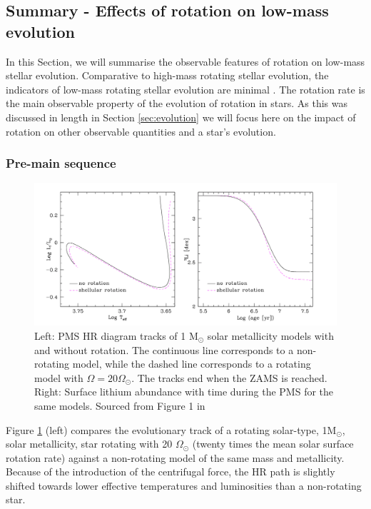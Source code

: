 \subsection{Summary - Effects of rotation on low-mass evolution}

In this Section, we will summarise the observable features of rotation on low-mass stellar evolution.
Comparative to high-mass rotating stellar evolution, the indicators of low-mass rotating stellar evolution are minimal \citep[See ][]{heger_presupernova_2000, maeder_evolution_2000}.
The rotation rate is the main observable property of the evolution of rotation in stars.
As this was discussed in length in Section \ref{sec:evolution} we will focus here on the impact of rotation on other observable quantities and a star's evolution.

\subsubsection{Pre-main sequence}

\begin{figure}[h]
    \includegraphics[width=\textwidth]{Figures/intro_figures/PMS_effect.png}
    \caption{Left: PMS HR diagram tracks of 1 M$_{\odot}$ solar metallicity models with and without rotation. The continuous line corresponds to a non-rotating model, while the dashed line corresponds to a rotating model with $\Omega = 20 \Omega_{\odot}$. The tracks end when the ZAMS is reached. Right: Surface lithium abundance with time during the PMS for the same models. Sourced from Figure 1 in \citet{eggenberger_rotation_2013}}
    \label{fig:pms_effect}
\end{figure}

Figure \ref{fig:pms_effect} (left) compares the evolutionary track of a rotating solar-type, 1M$_{\odot}$, solar metallicity, star rotating with 20 $\Omega_{\odot}$ (twenty times the mean solar surface rotation rate) against a non-rotating model of the same mass and metallicity. 
Because of the introduction of the centrifugal force, the HR path is slightly shifted towards lower effective temperatures and luminosities than a non-rotating star.

